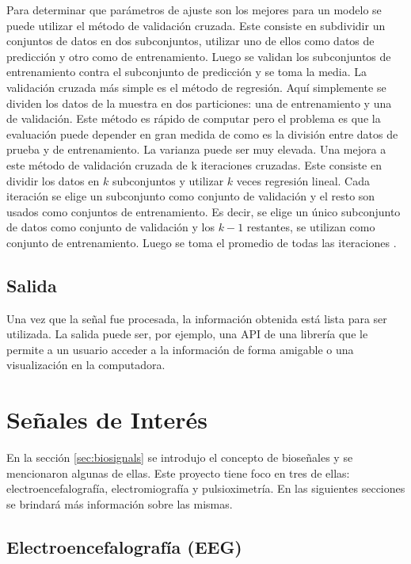 Para determinar que parámetros de ajuste son los mejores para un modelo se puede utilizar el método de validación cruzada. Este consiste en subdividir un conjuntos de datos en dos subconjuntos, utilizar uno de ellos como datos de predicción y otro como de entrenamiento. Luego se validan los subconjuntos de entrenamiento contra el subconjunto de predicción y se toma la media. La validación cruzada más simple es el método de regresión. Aquí simplemente se dividen los datos de la muestra en dos particiones: una de entrenamiento y una de validación. Este método es rápido de computar pero el problema es que la evaluación puede depender en gran medida de como es la división entre datos de prueba y de entrenamiento. La varianza puede ser muy elevada. Una mejora a este método de validación cruzada de k iteraciones cruzadas. Este consiste en dividir los datos en $k$ subconjuntos y utilizar   $k$ veces regresión lineal. Cada iteración se elige un subconjunto como conjunto de validación y el resto son usados como conjuntos de entrenamiento. Es decir, se elige un único subconjunto de datos como conjunto de validación y los $k -1$ restantes, se utilizan como conjunto de entrenamiento. Luego se toma el promedio de todas las iteraciones \cite{cross-validation}.

\subsection{Salida}

Una vez que la señal fue procesada, la información obtenida está lista para ser utilizada. La salida puede ser, por ejemplo, una API de una librería que le permite a un usuario acceder a la información de forma amigable o una visualización en la computadora.

\section{Señales de Interés}

En la sección \ref{sec:biosignals} se introdujo el concepto de bioseñales y se mencionaron algunas de ellas. Este proyecto tiene foco en tres de ellas: 
electroencefalografía, electromiografía y pulsioximetría. En las siguientes secciones se brindará más información sobre las mismas.

\subsection{Electroencefalografía (EEG)}

